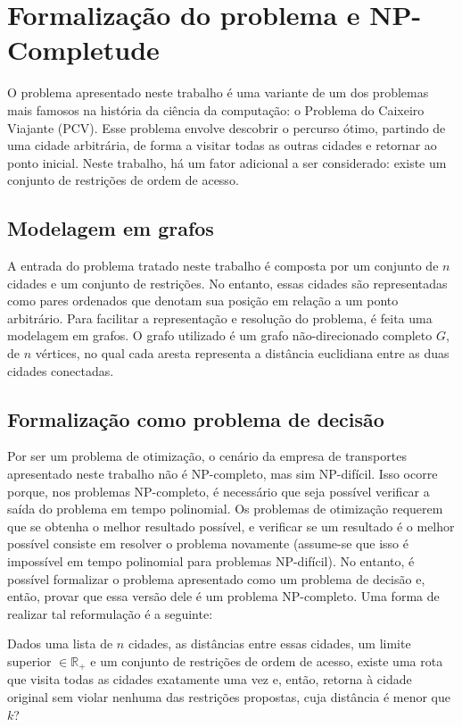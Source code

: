 \documentclass[10pt,a4paper]{article}
\numberwithin{equation}{section}
\begin{document}
\section{Formalização do problema e NP-Completude}

O problema apresentado neste trabalho é uma variante de um dos problemas mais famosos na história da ciência da computação: o Problema do Caixeiro Viajante (PCV). Esse problema envolve descobrir o percurso ótimo, partindo de uma cidade arbitrária, de forma a visitar todas as outras cidades e retornar ao ponto inicial. Neste trabalho, há um fator adicional a ser considerado: existe um conjunto de restrições de ordem de acesso.

\subsection{Modelagem em grafos}

A entrada do problema tratado neste trabalho é composta por um conjunto de $n$ cidades e um conjunto de restrições. No entanto, essas cidades são representadas como pares ordenados que denotam sua posição em relação a um ponto arbitrário. Para facilitar a representação e resolução do problema, é feita uma modelagem em grafos. O grafo utilizado é um grafo não-direcionado completo $G$, de $n$ vértices, no qual cada aresta representa a distância euclidiana entre as duas cidades conectadas.


\subsection{Formalização como problema de decisão}

Por ser um problema de otimização, o cenário da empresa de transportes apresentado neste trabalho não é NP-completo, mas sim NP-difícil. Isso ocorre porque, nos problemas NP-completo, é necessário que seja possível verificar a saída do problema em tempo polinomial. Os problemas de otimização requerem que se obtenha o melhor resultado possível, e verificar se um resultado é o melhor possível consiste em resolver o problema novamente (assume-se que isso é impossível em tempo polinomial para problemas NP-difícil). No entanto, é possível formalizar o problema apresentado como um problema de decisão e, então, provar que essa versão dele é um problema NP-completo. Uma forma de realizar tal reformulação é a seguinte:

Dados uma lista de $n$ cidades, as distâncias entre essas cidades, um limite superior $\in \mathbb{R}_{+}$ e um conjunto de restrições de ordem de acesso, existe uma rota que visita todas as cidades exatamente uma vez e, então, retorna à cidade original sem violar nenhuma das restrições propostas, cuja distância é menor que $k$?
\end{document}
